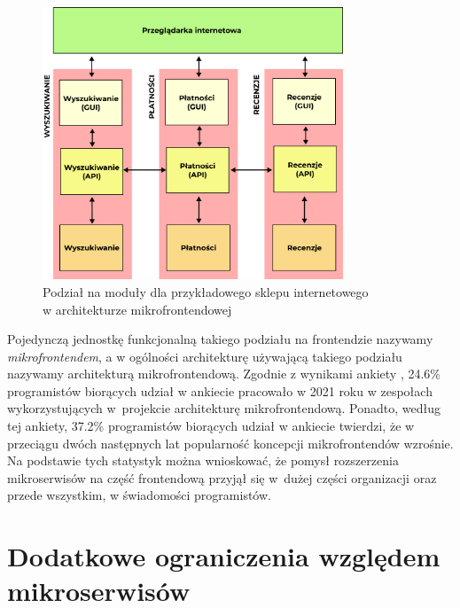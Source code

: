\documentclass{SGGW-thesis}
\begin{document}
  \begin{figure}[h]
    \centering
    \captionsetup{justification=centering}
    \includegraphics[width=0.8\textwidth]{microfrontends_diagram.png}
    \caption{Podział na moduły dla przykładowego sklepu internetowego \\ w architekturze mikrofrontendowej}
    \label{fig:microfrontends_diagram}
  \end{figure}
  
  Pojedynczą jednostkę funkcjonalną takiego podziału na frontendzie nazywamy \textit{mikrofrontendem}, a w ogólności architekturę używającą takiego podziału nazywamy architekturą mikrofrontendową.
  Zgodnie z wynikami ankiety \cite{tsh_2022}, 24.6\% programistów biorących udział w ankiecie pracowało w 2021 roku w zespołach wykorzystujących w~projekcie architekturę mikrofrontendową. Ponadto, według tej ankiety, 37.2\% programistów biorących udział w ankiecie twierdzi, że w przeciągu dwóch następnych lat popularność koncepcji mikrofrontendów wzrośnie. Na podstawie tych statystyk można wnioskować, że pomysł rozszerzenia mikroserwisów na część frontendową przyjął się w~dużej części organizacji oraz przede wszystkim, w świadomości programistów.

  \section{Dodatkowe ograniczenia względem mikroserwisów}
\end{document}
